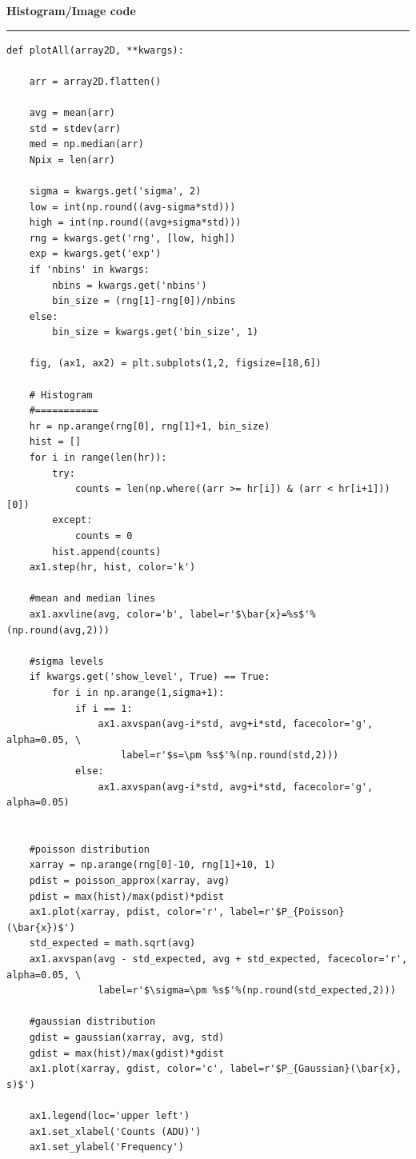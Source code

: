 \documentclass[preprint]{aastex62}
\begin{document}
\textbf{Histogram/Image code} \label{code:plots} \\
\hrule
\begin{lstlisting}
def plotAll(array2D, **kwargs):
    
    arr = array2D.flatten()
    
    avg = mean(arr)
    std = stdev(arr)
    med = np.median(arr)
    Npix = len(arr)    
    
    sigma = kwargs.get('sigma', 2)
    low = int(np.round((avg-sigma*std)))
    high = int(np.round((avg+sigma*std)))
    rng = kwargs.get('rng', [low, high])
    exp = kwargs.get('exp')
    if 'nbins' in kwargs:
        nbins = kwargs.get('nbins')
        bin_size = (rng[1]-rng[0])/nbins
    else:
        bin_size = kwargs.get('bin_size', 1)
    
    fig, (ax1, ax2) = plt.subplots(1,2, figsize=[18,6])
    
    # Histogram
    #===========
    hr = np.arange(rng[0], rng[1]+1, bin_size)
    hist = []
    for i in range(len(hr)):
        try:
            counts = len(np.where((arr >= hr[i]) & (arr < hr[i+1]))[0])
        except:
            counts = 0
        hist.append(counts)
    ax1.step(hr, hist, color='k')

    #mean and median lines
    ax1.axvline(avg, color='b', label=r'$\bar{x}=%s$'%(np.round(avg,2)))
    
    #sigma levels
    if kwargs.get('show_level', True) == True:
        for i in np.arange(1,sigma+1):
            if i == 1:
                ax1.axvspan(avg-i*std, avg+i*std, facecolor='g', alpha=0.05, \
                    label=r'$s=\pm %s$'%(np.round(std,2)))
            else:
                ax1.axvspan(avg-i*std, avg+i*std, facecolor='g', alpha=0.05)
                
                
    #poisson distribution
    xarray = np.arange(rng[0]-10, rng[1]+10, 1)
    pdist = poisson_approx(xarray, avg)
    pdist = max(hist)/max(pdist)*pdist
    ax1.plot(xarray, pdist, color='r', label=r'$P_{Poisson}(\bar{x})$')
    std_expected = math.sqrt(avg)
    ax1.axvspan(avg - std_expected, avg + std_expected, facecolor='r', alpha=0.05, \
                label=r'$\sigma=\pm %s$'%(np.round(std_expected,2)))
    
    #gaussian distribution
    gdist = gaussian(xarray, avg, std)
    gdist = max(hist)/max(gdist)*gdist
    ax1.plot(xarray, gdist, color='c', label=r'$P_{Gaussian}(\bar{x}, s)$')
    
    ax1.legend(loc='upper left')
    ax1.set_xlabel('Counts (ADU)')
    ax1.set_ylabel('Frequency')
    

\end{lstlisting}
\end{document}
